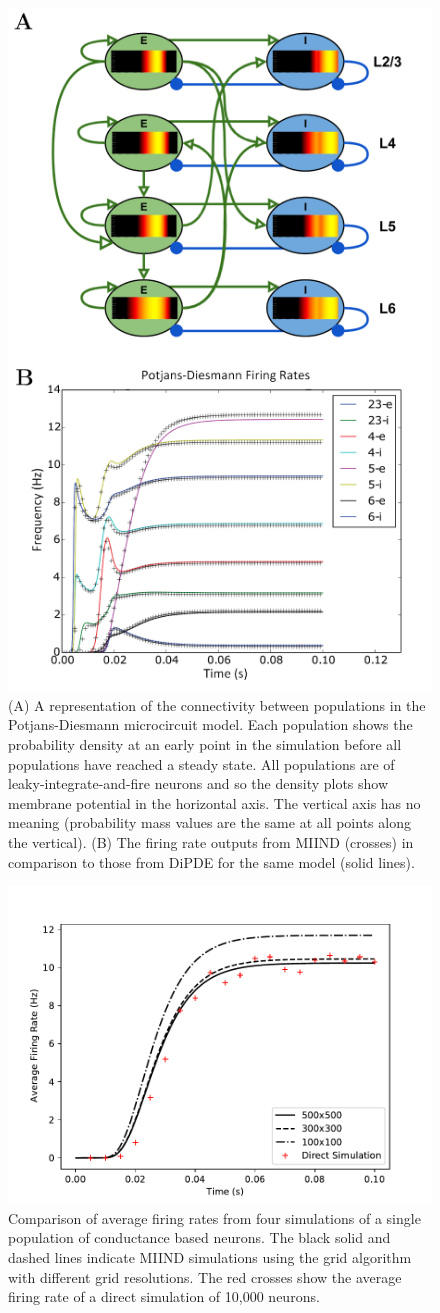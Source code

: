\documentclass[utf8]{frontiersSCNS} %
\begin{document}
\begin{figure}[tb!]
  \centering
    \includegraphics[width=0.6\linewidth]{images/potjans_full_figure.pdf}
  \caption{(A) A representation of the connectivity between populations in the Potjans-Diesmann microcircuit model. Each population shows the probability density at an early point in the simulation before all populations have reached a steady state. All populations are of leaky-integrate-and-fire neurons and so the density plots show membrane potential in the horizontal axis. The vertical axis has no meaning (probability mass values are the same at all points along the vertical). (B) The firing rate outputs from MIIND (crosses) in comparison to those from DiPDE for the same model (solid lines).}
  \label{fig:potjans}
\end{figure}

\begin{figure}[!htb]
  \centering
  \includegraphics[width=0.6\columnwidth]{images/grid_cond_comp.pdf}
  \caption{Comparison of average firing rates from four simulations of a single population of conductance based neurons. The black solid and dashed lines indicate MIIND simulations using the grid algorithm with different grid resolutions. The red crosses show the average firing rate of a direct simulation of 10,000 neurons.}
  \label{fig:gridcomp}
\end{figure}
\end{document}
